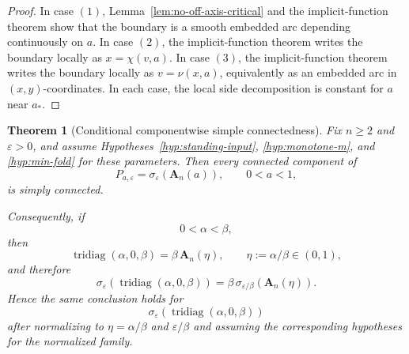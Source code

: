 \documentclass[11pt]{article}
\newtheorem{theorem}{Theorem}[section]
\DeclareMathOperator{\tridiag}{tridiag}
\begin{document}
\begin{proof}
In case \((1)\), Lemma~\ref{lem:no-off-axis-critical} and the implicit-function theorem show that the boundary is a smooth embedded arc depending continuously on \(a\). In case \((2)\), the implicit-function theorem writes the boundary locally as \(x=\chi(v,a)\). In case \((3)\), the implicit-function theorem writes the boundary locally as \(v=\nu(x,a)\), equivalently as an embedded arc in \((x,y)\)-coordinates. In each case, the local side decomposition is constant for \(a\) near \(a_*\).
\end{proof}

\begin{theorem}[Conditional componentwise simple connectedness]\label{thm:main}
Fix \(n\ge 2\) and \(\varepsilon>0\), and assume Hypotheses~\ref{hyp:standing-input}, \ref{hyp:monotone-m}, and \ref{hyp:min-fold} for these parameters. Then every connected component of
\[
P_{a,\varepsilon}
=
\sigma_\varepsilon(\mathbf A_n(a)),
\qquad 0<a<1,
\]
is simply connected.

Consequently, if
\[
0<\alpha<\beta,
\]
then
\[
\tridiag(\alpha,0,\beta)=\beta\,\mathbf A_n(\eta),
\qquad
\eta:=\alpha/\beta\in(0,1),
\]
and therefore
\[
\sigma_\varepsilon(\tridiag(\alpha,0,\beta))
=
\beta\,\sigma_{\varepsilon/\beta}(\mathbf A_n(\eta)).
\]
Hence the same conclusion holds for
\[
\sigma_\varepsilon(\tridiag(\alpha,0,\beta))
\]
after normalizing to \(\eta=\alpha/\beta\) and \(\varepsilon/\beta\) and assuming the corresponding hypotheses for the normalized family.
\end{theorem}
\end{document}
